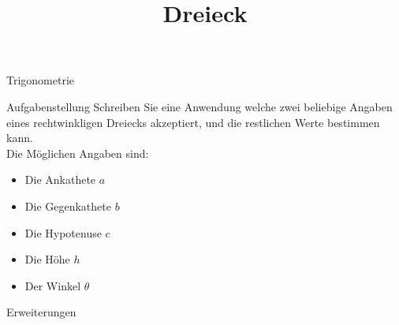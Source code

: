 \documentclass{article}
\title{Dreieck}
\begin{document}
	 \begin{section}{Trigonometrie}
	 	\begin{subsection}{Aufgabenstellung}
	 		Schreiben Sie eine Anwendung welche zwei beliebige Angaben eines rechtwinkligen Dreiecks akzeptiert, und die restlichen Werte bestimmen kann.\\
	 		Die Möglichen Angaben sind:
	 		\begin{itemize}
	 			\item Die Ankathete $a$
	 			\item Die Gegenkathete $b$
	 			\item Die Hypotenuse $c$
	 			\item Die Höhe $h$
	 			\item Der Winkel $\theta$
	 		\end{itemize}
 			
	 	\end{subsection}
	 	\begin{subsection}{Erweiterungen}
	 		
	 	\end{subsection}
	\end{section}
\end{document}
